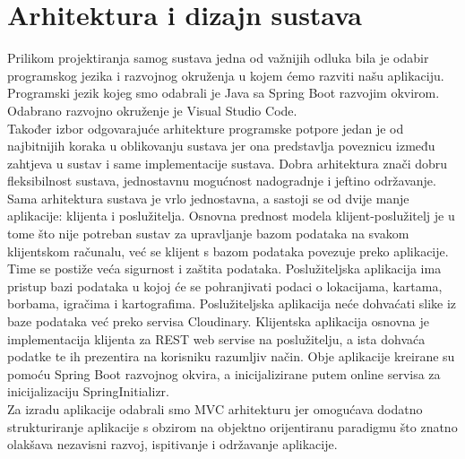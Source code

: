 \chapter{Arhitektura i dizajn sustava}
		


		{Prilikom projektiranja samog sustava jedna od važnijih odluka bila je odabir programskog jezika i razvojnog okruženja u kojem ćemo razviti našu aplikaciju. Programski jezik kojeg smo odabrali je Java sa Spring Boot razvojim okvirom. Odabrano razvojno okruženje je Visual Studio Code.}	\\
		{Također izbor odgovarajuće arhitekture programske potpore jedan je od najbitnijih koraka u oblikovanju sustava jer ona predstavlja poveznicu između zahtjeva u sustav i same implementacije sustava. Dobra arhitektura znači dobru fleksibilnost sustava, jednostavnu mogućnost nadogradnje i jeftino održavanje.}\\
		{Sama arhitektura sustava je vrlo jednostavna, a sastoji se od dvije manje aplikacije: klijenta i poslužitelja. Osnovna prednost modela klijent-poslužitelj je u tome što nije potreban sustav za upravljanje bazom podataka na svakom klijentskom računalu, već se klijent s bazom podataka povezuje preko aplikacije. Time se postiže veća sigurnost i zaštita podataka. Poslužiteljska aplikacija ima pristup bazi podataka u kojoj će se pohranjivati podaci o lokacijama, kartama, borbama, igračima i kartografima. Poslužiteljska aplikacija neće dohvaćati slike iz baze podataka već preko servisa Cloudinary. Klijentska aplikacija osnovna je implementacija klijenta za REST web servise na poslužitelju, a ista dohvaća podatke te ih prezentira na korisniku razumljiv način. Obje aplikacije kreirane su pomoću Spring Boot razvojnog okvira, a inicijalizirane putem online servisa za inicijalizaciju SpringInitializr.}\\
		{Za izradu aplikacije odabrali smo MVC arhitekturu jer omogućava dodatno strukturiranje aplikacije s obzirom na objektno orijentiranu paradigmu što znatno olakšava nezavisni razvoj, ispitivanje i održavanje aplikacije.}		

